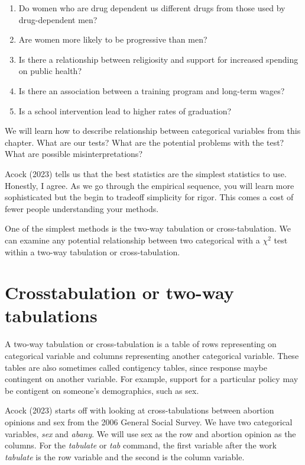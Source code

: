 \documentclass[
]{book}
\providecommand{\tightlist}{%
  \setlength{\itemsep}{0pt}\setlength{\parskip}{0pt}}
\begin{document}
\begin{enumerate}
\def\labelenumi{\arabic{enumi}.}
\tightlist
\item
  Do women who are drug dependent us different drugs from those used by drug-dependent men?
\item
  Are women more likely to be progressive than men?
\item
  Is there a relationship between religiosity and support for increased spending on public health?
\item
  Is there an association between a training program and long-term wages?
\item
  Is a school intervention lead to higher rates of graduation?
\end{enumerate}

We will learn how to describe relationship between categorical variables from this chapter. What are our tests? What are the potential problems with the test? What are possible misinterpretations?

Acock (2023) tells us that the best statistics are the simplest statistics to use. Honestly, I agree. As we go through the empirical sequence, you will learn more sophisticated but the begin to tradeoff simplicity for rigor. This comes a cost of fewer people understanding your methods.

One of the simplest methods is the two-way tabulation or cross-tabulation. We can examine any potential relationship between two categorical with a \(\chi^2\) test within a two-way tabulation or cross-tabulation.

\section{Crosstabulation or two-way tabulations}\label{crosstabulation-or-two-way-tabulations}

A two-way tabulation or cross-tabulation is a table of rows representing on categorical variable and columns representing another categorical variable. These tables are also sometimes called contigency tables, since response maybe contingent on another variable. For example, support for a particular policy may be contigent on someone's demographics, such as sex.

Acock (2023) starts off with looking at cross-tabulations between abortion opinions and sex from the 2006 General Social Survey. We have two categorical variables, \emph{sex} and \emph{abany}. We will use sex as the row and abortion opinion as the columns. For the \emph{tabulate} or \emph{tab } command, the first variable after the work \emph{tabulate} is the row variable and the second is the column variable.
\end{document}
